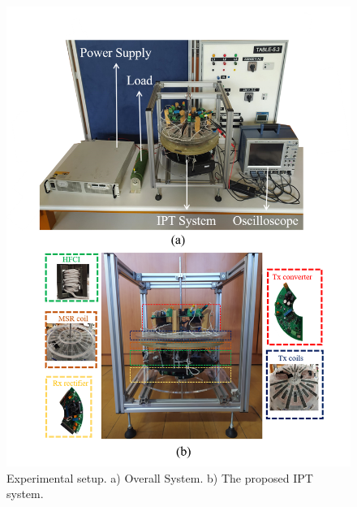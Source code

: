 \documentclass[journal]{IEEEtran}
\begin{document}
\begin{figure}[h!]
\centering
\includegraphics[width=1\linewidth]{experimental_setup2.png}
\caption{ Experimental setup. a) Overall System. b) The proposed IPT system.}
\label{fig:experimentalsetup}
\end{figure}

\end{document}
